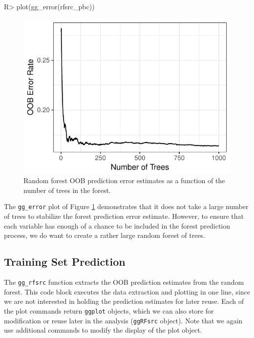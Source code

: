 \documentclass[article]{jss}
\begin{document}
\begin{Schunk}
\begin{Sinput}
R> plot(gg_error(rfsrc_pbc))
\end{Sinput}
\begin{figure}[!htb]

{\centering \includegraphics{fig-rfs/rfs-errorPlot-1} 

}

\caption[Random forest OOB prediction error estimates as a function of the number of trees in the forest]{Random forest OOB prediction error estimates as a function of the number of trees in the forest.}\label{fig:errorPlot}
\end{figure}
\end{Schunk}

The \texttt{gg\_error} plot of Figure \ref{fig:errorPlot} demonstrates
that it does not take a large number of trees to stabilize the forest
prediction error estimate. However, to ensure that each variable has
enough of a chance to be included in the forest prediction process, we
do want to create a rather large random forest of trees.

\subsection{Training Set Prediction}\label{training-set-prediction}

The \texttt{gg\_rfsrc} function extracts the OOB prediction estimates
from the random forest. This code block executes the data extraction and
plotting in one line, since we are not interested in holding the
prediction estimates for later reuse. Each of the 
plot commands return \texttt{ggplot} objects, which we can also store
for modification or reuse later in the analysis (\texttt{ggRFsrc}
object). Note that we again use additional  commands to
modify the display of the plot object.
\end{document}

